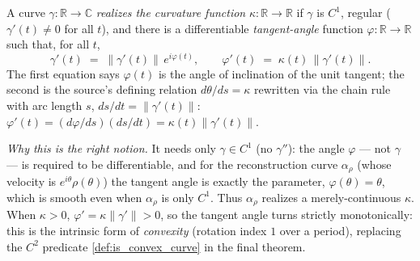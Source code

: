 \begin{definition}

  \label{def:realizes_curvature}
  A curve $\gamma : \mathbb{R} \to \mathbb{C}$ \emph{realizes the curvature
  function} $\kappa : \mathbb{R} \to \mathbb{R}$ if $\gamma$ is $C^1$, regular
  ($\gamma'(t) \neq 0$ for all $t$), and there is a differentiable
  \emph{tangent-angle} function $\varphi : \mathbb{R} \to \mathbb{R}$ such that,
  for all $t$,
  \[
    \gamma'(t) \;=\; \lVert \gamma'(t)\rVert \, e^{i\varphi(t)},
    \qquad
    \varphi'(t) \;=\; \kappa(t)\,\lVert \gamma'(t)\rVert .
  \]
  The first equation says $\varphi(t)$ is the angle of inclination of the unit
  tangent; the second is the source's defining relation $d\theta/ds = \kappa$
  rewritten via the chain rule with arc length $s$, $ds/dt = \lVert\gamma'(t)
  \rVert$: $\varphi'(t) = (d\varphi/ds)(ds/dt) = \kappa(t)\lVert\gamma'(t)\rVert$.

  \emph{Why this is the right notion.} It needs only $\gamma \in C^1$ (no
  $\gamma''$): the angle $\varphi$ — not $\gamma$ — is required to be
  differentiable, and for the reconstruction curve $\alpha_\rho$ (whose velocity
  is $e^{i\theta}\rho(\theta)$) the tangent angle is exactly the parameter,
  $\varphi(\theta) = \theta$, which is smooth even when $\alpha_\rho$ is only
  $C^1$. Thus $\alpha_\rho$ realizes a merely-continuous $\kappa$. When $\kappa >
  0$, $\varphi' = \kappa\lVert\gamma'\rVert > 0$, so the tangent angle turns
  strictly monotonically: this is the intrinsic form of \emph{convexity}
  (rotation index $1$ over a period), replacing the $C^2$ predicate
  \cref{def:is_convex_curve} in the final theorem.
\end{definition}

